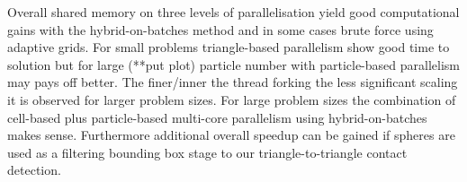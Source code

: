 Overall shared memory on three levels of parallelisation yield good computational gains with the hybrid-on-batches method and in some cases brute force using adaptive grids. For small problems triangle-based parallelism show good time to solution but for large (**put plot) particle number with particle-based parallelism may pays off better. The finer/inner the thread forking the less significant scaling it is observed for larger problem sizes. For large problem sizes the combination of cell-based plus particle-based multi-core parallelism using hybrid-on-batches makes sense. Furthermore additional overall speedup can be gained if spheres are used as a filtering bounding box stage to our triangle-to-triangle contact detection.

\clearpage

